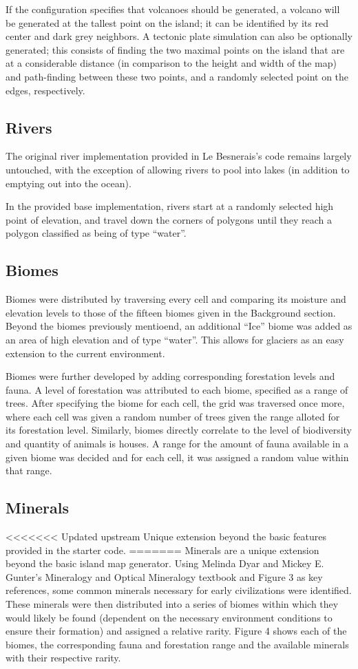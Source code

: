 If the configuration specifies that volcanoes should be generated, a volcano will be generated at the tallest point on the island; it can be identified by its red center and dark grey neighbors. A tectonic plate simulation can also be optionally generated; this consists of finding the two maximal points on the island that are at a considerable distance (in comparison to the height and width of the map) and path-finding between these two points, and a randomly selected point on the edges, respectively.

\subsection{Rivers}
The original river implementation provided in Le Besnerais's code remains largely untouched, with the exception of allowing rivers to pool into lakes (in addition to emptying out into the ocean).

In the provided base implementation, rivers start at a randomly selected high point of elevation, and travel down the corners of polygons until they reach a polygon classified as being of type ``water''.

\subsection{Biomes}
Biomes were distributed by traversing every cell and comparing its moisture and elevation levels to those of the fifteen biomes given in the Background section. Beyond the biomes previously mentioend, an additional ``Ice'' biome was added as an area of high elevation and of type ``water''. This allows for glaciers as an easy extension to the current environment. 

Biomes were further developed by adding corresponding forestation levels and fauna.  
A level of forestation was attributed to each biome, specified as a range of trees. After specifying the biome for each cell, the grid was traversed once more, where each cell was given a random number of trees given the range alloted for its forestation level. Similarly, biomes directly correlate to the level of biodiversity and quantity of animals is houses. A range for the amount of fauna available in a given biome was decided and for each cell, it was assigned a random value within that range.

\subsection{Minerals}
<<<<<<< Updated upstream
Unique extension beyond the basic features provided in the starter code.
=======
Minerals are a unique extension beyond the basic island map generator. Using Melinda Dyar and Mickey E. Gunter's Mineralogy and Optical Mineralogy textbook and Figure 3 as key references, some common minerals necessary for early civilizations were identified. These minerals were then distributed into a series of biomes within which they would likely be found (dependent on the necessary environment conditions to ensure their formation) and assigned a relative rarity. Figure 4 shows each of the biomes, the corresponding fauna and forestation range and the available minerals with their respective rarity. 

